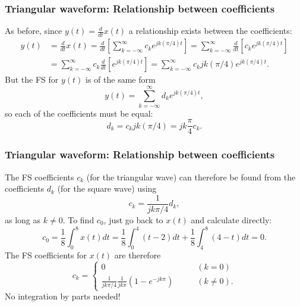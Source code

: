 \documentclass[10pt]{beamer}
\begin{document}
\begin{frame}
\frametitle{Triangular waveform:  Relationship between coefficients}

As before, since $y(t) = \frac{d}{dt} x(t)$ a relationship exists between
the coefficients:
\begin{align*}
  y(t) &= \frac{d}{dt} x(t) = \frac{d}{dt} \left[
  \sum_{k=-\infty}^\infty c_k e^{j k (\pi/4) t} \right] 
  = \sum_{k=-\infty}^\infty \frac{d}{dt} \left[
  c_k e^{j k (\pi/4) t} \right] \\
  &= \sum_{k=-\infty}^\infty c_k \frac{d}{dt} \left[
  e^{j k (\pi/4) t} \right]
  = \sum_{k=-\infty}^\infty c_k j k (\pi/4) e^{j k (\pi/4) t}.
\end{align*}
But the FS for $y(t)$ is of the same form
\begin{equation*}
  y(t) = \sum_{k=-\infty}^\infty d_k e^{j k (\pi/4) t},
\end{equation*}
so each of the coefficients must be equal:
\begin{equation*}
  d_k = c_k j k (\pi/4) = j k \frac{\pi}{4} c_k.
\end{equation*}
\end{frame}

\begin{frame}
\frametitle<presentation>{Triangular waveform:  Relationship between coefficients}
The FS coefficients $c_k$ (for the triangular wave) can therefore be 
found from the coefficients $d_k$ (for the square wave) using
\begin{equation*}
  c_k = \frac{1}{j k \pi/4} d_k,
\end{equation*}
as long as $k \neq 0$.  To find $c_0$, just go
back to $x(t)$ and calculate directly:
\begin{equation*}
  c_0 = \frac{1}{8} \int_0^8 x(t) dt = 
  \frac{1}{8} \int_0^4 (t-2) dt + \frac{1}{8} \int_4^8 (4-t) dt = 0.
\end{equation*}
The FS coefficients for $x(t)$ are therefore
\begin{equation*}
  c_k = \begin{cases}
  0 \qquad & (k=0) \\
  \frac{1}{j k \pi/4} \frac{1}{j k \pi} (1 - e^{-j k \pi}) \qquad & (k \neq 0).
  \end{cases}
\end{equation*}
No integration by parts needed!
\end{frame}
\end{document}
